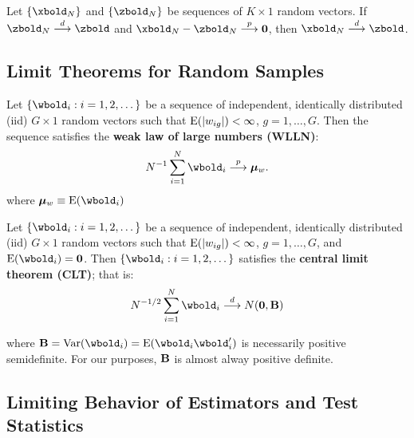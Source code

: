 \documentclass[11pt, oneside, a4paper, article]{article}
\numberwithin{equation}{section}
\begin{document}
\begin{lem}
	Let $\seq{\xbold_{N}}$ and $\seq{\zbold_{N}}$ be sequences of $K \times 1$ random vectors.
	If $\zbold_{N} \arrowd \zbold$ and $\xbold_{N} - \zbold_{N} \arrowp \mbs{0}$, then
	$\xbold_{N} \arrowd \zbold$.
\end{lem}

\subsection{Limit Theorems for Random Samples}

\begin{teo}
Let $\seq{\wbold_{i}:i=1,2,\dots}$ be a sequence of independent, identically distributed (iid) $G \times 1$ random vectors such that
$\text{E}( | w_{ig} | ) < \infty$, $g=1,\dots, G$.
Then the sequence satisfies the \textbf{weak law of large numbers (WLLN)}:
	\begin{equation*}
		N^{-1} \sum_{i=1}^{N} \wbold_{i} \arrowp \mubold_{w}.
	\end{equation*}
where $\mubold_{w} \equiv \E(\wbold_{i})$
\end{teo}

\begin{teo}
Let $\seq{\wbold_{i}:i=1,2,\dots}$ be a sequence of independent, identically distributed (iid) $G \times 1$ random vectors such that
$\text{E}( | w_{ig} | ) < \infty$, $g=1,\dots, G$, and
$\E(\wbold_{i}) = \mbs{0}$.
Then $\seq{\wbold_{i}:i=1,2,\dots}$ satisfies the \textbf{central limit theorem (CLT)}; that is:
	\begin{equation*}
		N^{-1/2} \sum_{i=1}^{N} \wbold_{i} \arrowd N(\mbs{0}, \Bbold)
	\end{equation*}
\end{teo}
where $\Bbold = \Var(\wbold_{i}) = \E(\wbold_{i} \wbold_{i}')$
is necessarily positive semidefinite.
For our purposes, $\mathbf{B}$ is almost alway positive definite.

\subsection{Limiting Behavior of Estimators and Test Statistics}
\end{document}
